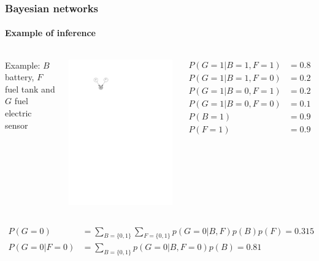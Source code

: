\documentclass[slidestop,compress,mathserif]{beamer}
\begin{document}
\begin{frame}
	\frametitle{Bayesian networks}
	\framesubtitle{Example of inference}
     \begin{columns}
    \column[c]{6cm}
    Example: $B$ battery, $F$ fuel tank and $G$ fuel electric sensor
    \begin{center}
    \includegraphics[width=.4\textwidth]{fuel}
    \end{center}
    \column[c]{6cm}
    \begin{align*}
    P(G=1|B=1,F=1) & = 0.8\\
    P(G=1|B=1,F=0) & = 0.2\\
    P(G=1|B=0,F=1) & = 0.2\\
    P(G=1|B=0,F=0) & = 0.1\\
    P(B=1) & = 0.9\\
    P(F=1) & = 0.9
    \end{align*}
    \end{columns}
    \begin{align*}
    P(G=0) & = \sum_{B=\{0,1\}}\sum_{F=\{0,1\}}p(G=0|B,F)p(B)p(F)=0.315\\
    P(G=0|F=0) & = \sum_{B=\{0,1\}}p(G=0|B,F=0)p(B)=0.81\\
    \end{align*}
\end{frame}
\end{document}
